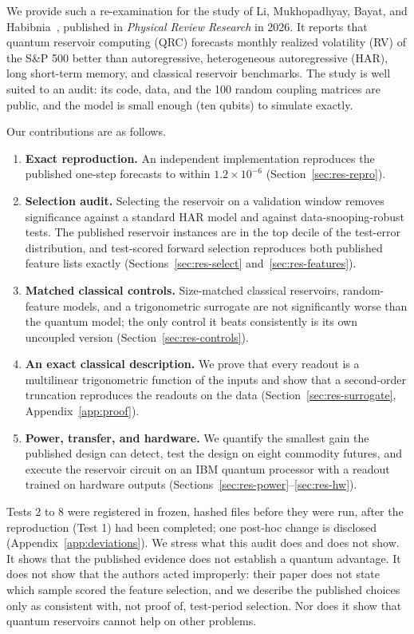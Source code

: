 \documentclass{ieeeaccess}
\begin{document}
We provide such a re-examination for the study of Li, Mukhopadhyay, Bayat, and Habibnia~\cite{li2026}, published in \emph{Physical Review Research} in 2026. It reports that quantum reservoir computing (QRC) forecasts monthly realized volatility (RV) of the S\&P 500 better than autoregressive, heterogeneous autoregressive (HAR), long short-term memory, and classical reservoir benchmarks. The study is well suited to an audit: its code, data, and the 100 random coupling matrices are public, and the model is small enough (ten qubits) to simulate exactly.

Our contributions are as follows.
\begin{enumerate}
\item \textbf{Exact reproduction.} An independent implementation reproduces the published one-step forecasts to within $1.2\times10^{-6}$ (Section~\ref{sec:res-repro}).
\item \textbf{Selection audit.} Selecting the reservoir on a validation window removes significance against a standard HAR model and against data-snooping-robust tests. The published reservoir instances are in the top decile of the test-error distribution, and test-scored forward selection reproduces both published feature lists exactly (Sections~\ref{sec:res-select} and~\ref{sec:res-features}).
\item \textbf{Matched classical controls.} Size-matched classical reservoirs, random-feature models, and a trigonometric surrogate are not significantly worse than the quantum model; the only control it beats consistently is its own uncoupled version (Section~\ref{sec:res-controls}).
\item \textbf{An exact classical description.} We prove that every readout is a multilinear trigonometric function of the inputs and show that a second-order truncation reproduces the readouts on the data (Section~\ref{sec:res-surrogate}, Appendix~\ref{app:proof}).
\item \textbf{Power, transfer, and hardware.} We quantify the smallest gain the published design can detect, test the design on eight commodity futures, and execute the reservoir circuit on an IBM quantum processor with a readout trained on hardware outputs (Sections~\ref{sec:res-power}--\ref{sec:res-hw}).
\end{enumerate}

Tests 2 to 8 were registered in frozen, hashed files before they were run, after the reproduction (Test 1) had been completed; one post-hoc change is disclosed (Appendix~\ref{app:deviations}). We stress what this audit does and does not show. It shows that the published evidence does not establish a quantum advantage. It does not show that the authors acted improperly: their paper does not state which sample scored the feature selection, and we describe the published choices only as consistent with, not proof of, test-period selection. Nor does it show that quantum reservoirs cannot help on other problems.
\end{document}
